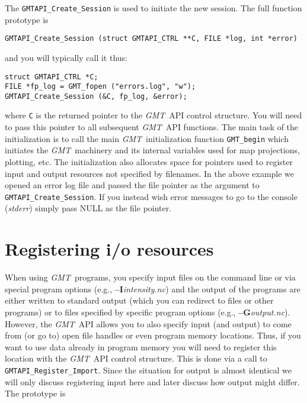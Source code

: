 \documentclass{report}
\newcommand{\GMT}{\textit{GMT}}%
\newcommand{\GMT}{\htmladdnormallink{\texttt{[image: eps/GMT\_glyph10.eps]}}{http://gmt.soest.hawaii.edu}}%
\newcommand{\Opt}[1]{{\bf --#1}}%
\newcommand{\GMT}{\htmladdnormallink{\textbf{GMT}}{http://gmt.soest.hawaii.edu}}%
\newcommand{\Opt}[1]{{\bf -#1}}%
\begin{document}
The \texttt{GMTAPI\_Create\_Session} is used to initiate the new session.  The full
function prototype is

\begin{verbatim}
GMTAPI_Create_Session (struct GMTAPI_CTRL **C, FILE *log, int *error)
\end{verbatim}
and you will typically call it thus:
\begin{verbatim}
struct GMTAPI_CTRL *C;
FILE *fp_log = GMT_fopen ("errors.log", "w");
GMTAPI_Create_Session (&C, fp_log, &error);
\end{verbatim}
where \texttt{C} is the returned pointer to the \GMT\ API control structure.  You will need to
pass this pointer to all subsequent \GMT\ API functions.  The main task of the initialization
is to call the main \GMT\ initialization function \texttt{GMT\_begin} which initiates the \GMT\
machinery and its internal variables used for map projections, plotting, etc.  The initialization
also allocates space for pointers used to register input and output resources not specified by filenames.
In the above example we opened an error log file and passed the file pointer as the argument to
\texttt{GMTAPI\_Create\_Session}.  If you instead wish error messages to go to the console
(\emph{stderr}) simply pass NULL as the file pointer.

\section{Registering i/o resources}
\index{GMT@\GMT!Registering i/o resources}
When using \GMT\ programs, you specify input files on
the command line or via special program options (e.g., \Opt{I}{\it intensity.nc}) and the output of
the programs are either written to standard output (which you can redirect to files or other programs)
or to files specified by specific program options (e.g., \Opt{G}{\it output.nc}).  However, the
\GMT\ API allows you to also specify input (and output) to come from (or go to) open file handles
or even program memory locations.  Thus, if you want to use data already in program memory you will
need to register this location with the \GMT\ API control structure.  This is done via a call to
\texttt{GMTAPI\_Register\_Import}.  Since the situation for output is almost identical we will only
discuss registering input here and later discuss how output might differ.  The prototype is
\end{document}
